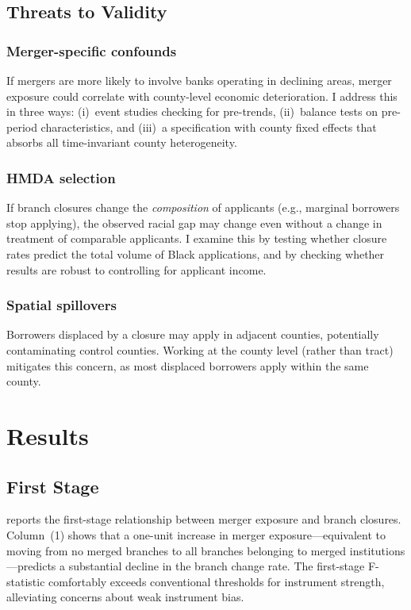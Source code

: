 \documentclass[12pt]{article}
\begin{document}
\subsection{Threats to Validity}

\subsubsection*{Merger-specific confounds} If mergers are more likely to involve banks operating in declining areas, merger exposure could correlate with county-level economic deterioration. I address this in three ways: (i)~event studies checking for pre-trends, (ii)~balance tests on pre-period characteristics, and (iii)~a specification with county fixed effects that absorbs all time-invariant county heterogeneity.

\subsubsection*{HMDA selection} If branch closures change the \emph{composition} of applicants (e.g., marginal borrowers stop applying), the observed racial gap may change even without a change in treatment of comparable applicants. I examine this by testing whether closure rates predict the total volume of Black applications, and by checking whether results are robust to controlling for applicant income.

\subsubsection*{Spatial spillovers} Borrowers displaced by a closure may apply in adjacent counties, potentially contaminating control counties. Working at the county level (rather than tract) mitigates this concern, as most displaced borrowers apply within the same county.


\section{Results}
\label{sec:results}

\subsection{First Stage}

 reports the first-stage relationship between merger exposure and branch closures. Column~(1) shows that a one-unit increase in merger exposure---equivalent to moving from no merged branches to all branches belonging to merged institutions---predicts a substantial decline in the branch change rate. The first-stage F-statistic comfortably exceeds conventional thresholds for instrument strength, alleviating concerns about weak instrument bias.
\end{document}
